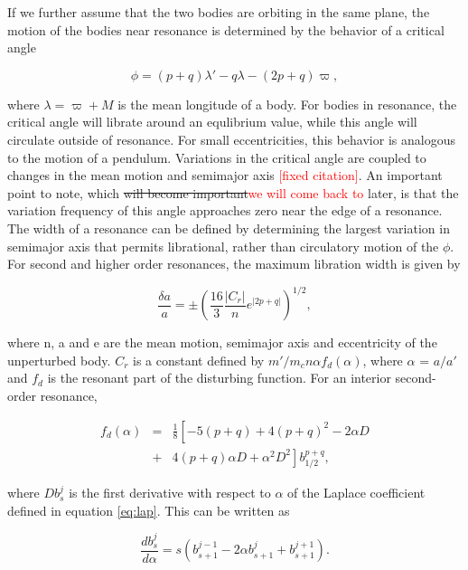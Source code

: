 \documentclass[twocolumn]{aastex63}
\newcommand{\ACBc}[1]{\textcolor{red}{#1}}
\begin{document}
If we further assume that the two bodies are orbiting in the same plane, the motion of the bodies near resonance is determined by the
behavior of a critical angle

\begin{equation}\label{eq:phi_crit}
	\phi = (p + q) \lambda' - q \lambda - (2 p + q) \varpi,
\end{equation}

\noindent where $\lambda = \varpi + M$ is the mean longitude of a body. For bodies in resonance, the critical angle will librate around an 
equlibrium value, while this angle will circulate outside of resonance. For small eccentricities, this behavior is analogous to the motion of a 
pendulum. Variations in the critical angle are coupled to changes in the mean motion and semimajor axis \citep{2000ssd..book.....M}\ACBc{[fixed citation]}. An important 
point to note, which \sout{will become important}\ACBc{we will come back to} later, is that the variation frequency of this angle approaches zero near the edge of a resonance. The 
width of a resonance can be defined by determining the largest variation in semimajor axis that permits librational, rather than circulatory motion of 
the $\phi$. For second and higher order resonances, the maximum libration width is given by

\begin{equation}\label{eq:res_so}
	\frac{\delta a}{a} = \pm \left( \frac{16}{3} \frac{\left| C_{r} \right|}{n} e^{\left| 2 p + q \right|} \right)^{1/2},
\end{equation}

\noindent where n, a and e are the mean motion, semimajor axis and eccentricity of the unperturbed body. $C_{r}$ is a constant defined by 
$m'/m_{c} n \alpha f_{d}(\alpha)$, where $\alpha$ = $a/a'$ and $f_{d}$ is the resonant part of the disturbing function. For an interior second-order 
resonance,

\begin{eqnarray}\label{eq:fd_so}
	f_{d} (\alpha) &=& \frac{1}{8} \left[ -5(p+q) + 4(p+q)^{2} - 2 \alpha D \right. \\ \nonumber
	                      & + & \left. 4(p+q) \alpha D + \alpha^{2} D^{2} \right] b^{p+q}_{1/2},
\end{eqnarray}

\noindent where $D b^{j}_{s}$ is the first derivative with respect to $\alpha$ of the Laplace coefficient defined in equation \ref{eq:lap}. This can 
be written as

\begin{equation}\label{eq:lap_d}
	\frac{d b_{s}^{j}}{d \alpha} = s \left( b_{s+1}^{j-1} - 2 \alpha b_{s+1}^{j} + b_{s+1}^{j+1} \right).
\end{equation}
\end{document}
